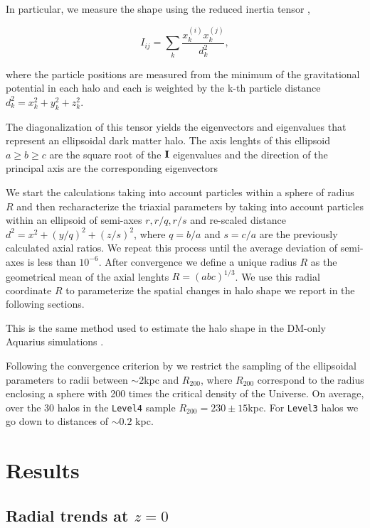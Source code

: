 \documentclass[a4paper,fleqn,usenatbib]{mnras}
\begin{document}
In particular, we measure the shape using the reduced inertia tensor
\citep{Allgood_et_al._2006},  

\begin{equation}
I_{ij} = \sum_k \frac{x_k^{(i)}x_k^{(j)}}{d^2_k},
\label{eq:inertia}
\end{equation}

where the particle positions are measured from the minimum of the
gravitational potential in each halo and each is weighted by the k-th
particle distance 
$d_k^2=x_k^2+y_k^2+z_k^2$.

The diagonalization of this tensor yields the eigenvectors and
eigenvalues that represent an ellipsoidal dark matter halo.
The axis lenghts of this ellipsoid $a\geq b \geq c$ are the square
root of the ${\bf I}$ eigenvalues and the direction of the principal
axis are the corresponding eigenvectors 

We start the calculations taking into account particles within a
sphere of radius $R$ and then recharacterize the triaxial parameters
by taking into account particles within an ellipsoid of semi-axes
$r,r/q,r/s$ and re-scaled distance $d^2=x^2+(y/q)^2+(z/s)^2$, where $q
= b/a$ and $s=c/a$ are the previously calculated axial ratios. 
We repeat this process until the average deviation of semi-axes is
less than $10^{-6}$.  
After convergence we define a unique radius $R$ as the geometrical
mean of the axial lenghts $R=(abc)^{1/3}$.
We use this radial coordinate $R$ to parameterize the spatial changes
in halo shape we report in the following sections.

This is the same method used to estimate the halo shape in the DM-only
Aquarius simulations \citep{VeraCiro11}. 

Following the convergence criterion by \cite{Vera-Crito_et_al.2011} we
restrict the sampling of the ellipsoidal parameters to radii  between
$\sim 2$kpc and $R_{200}$, where  $R_{200}$ correspond to the  radius
enclosing a sphere with 200 times the critical density of the Universe.
On average, over the 30 halos in the \texttt{Level4} sample
$R_{200}=230\pm 15$kpc. 
For \texttt{Level3} halos we go down to distances of $\sim 0.2$ kpc.  

\section{Results}

\subsection{Radial trends at $z=0$}
\end{document}
